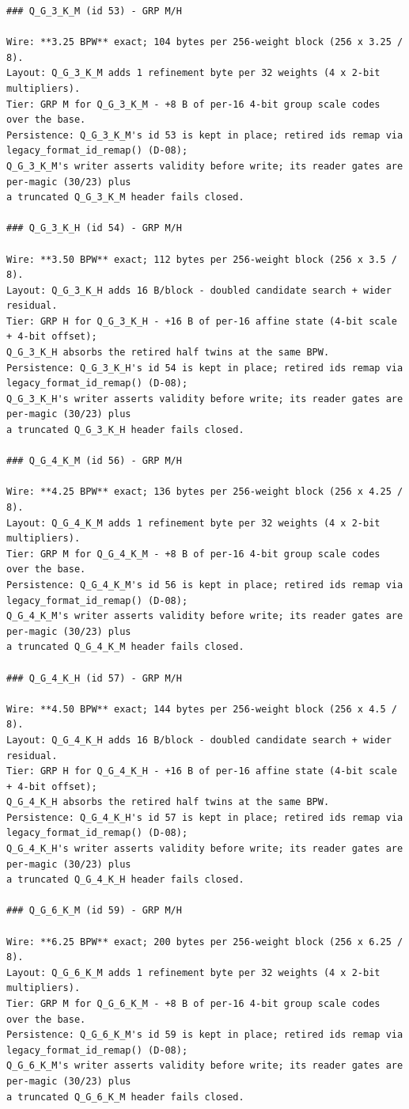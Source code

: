 \begin{Verbatim}[breaklines,breakanywhere,fontsize=\footnotesize]
### Q_G_3_K_M (id 53) - GRP M/H

Wire: **3.25 BPW** exact; 104 bytes per 256-weight block (256 x 3.25 / 8).
Layout: Q_G_3_K_M adds 1 refinement byte per 32 weights (4 x 2-bit multipliers).
Tier: GRP M for Q_G_3_K_M - +8 B of per-16 4-bit group scale codes over the base.
Persistence: Q_G_3_K_M's id 53 is kept in place; retired ids remap via legacy_format_id_remap() (D-08);
Q_G_3_K_M's writer asserts validity before write; its reader gates are per-magic (30/23) plus
a truncated Q_G_3_K_M header fails closed.

### Q_G_3_K_H (id 54) - GRP M/H

Wire: **3.50 BPW** exact; 112 bytes per 256-weight block (256 x 3.5 / 8).
Layout: Q_G_3_K_H adds 16 B/block - doubled candidate search + wider residual.
Tier: GRP H for Q_G_3_K_H - +16 B of per-16 affine state (4-bit scale + 4-bit offset);
Q_G_3_K_H absorbs the retired half twins at the same BPW.
Persistence: Q_G_3_K_H's id 54 is kept in place; retired ids remap via legacy_format_id_remap() (D-08);
Q_G_3_K_H's writer asserts validity before write; its reader gates are per-magic (30/23) plus
a truncated Q_G_3_K_H header fails closed.

### Q_G_4_K_M (id 56) - GRP M/H

Wire: **4.25 BPW** exact; 136 bytes per 256-weight block (256 x 4.25 / 8).
Layout: Q_G_4_K_M adds 1 refinement byte per 32 weights (4 x 2-bit multipliers).
Tier: GRP M for Q_G_4_K_M - +8 B of per-16 4-bit group scale codes over the base.
Persistence: Q_G_4_K_M's id 56 is kept in place; retired ids remap via legacy_format_id_remap() (D-08);
Q_G_4_K_M's writer asserts validity before write; its reader gates are per-magic (30/23) plus
a truncated Q_G_4_K_M header fails closed.

### Q_G_4_K_H (id 57) - GRP M/H

Wire: **4.50 BPW** exact; 144 bytes per 256-weight block (256 x 4.5 / 8).
Layout: Q_G_4_K_H adds 16 B/block - doubled candidate search + wider residual.
Tier: GRP H for Q_G_4_K_H - +16 B of per-16 affine state (4-bit scale + 4-bit offset);
Q_G_4_K_H absorbs the retired half twins at the same BPW.
Persistence: Q_G_4_K_H's id 57 is kept in place; retired ids remap via legacy_format_id_remap() (D-08);
Q_G_4_K_H's writer asserts validity before write; its reader gates are per-magic (30/23) plus
a truncated Q_G_4_K_H header fails closed.

### Q_G_6_K_M (id 59) - GRP M/H

Wire: **6.25 BPW** exact; 200 bytes per 256-weight block (256 x 6.25 / 8).
Layout: Q_G_6_K_M adds 1 refinement byte per 32 weights (4 x 2-bit multipliers).
Tier: GRP M for Q_G_6_K_M - +8 B of per-16 4-bit group scale codes over the base.
Persistence: Q_G_6_K_M's id 59 is kept in place; retired ids remap via legacy_format_id_remap() (D-08);
Q_G_6_K_M's writer asserts validity before write; its reader gates are per-magic (30/23) plus
a truncated Q_G_6_K_M header fails closed.


\end{Verbatim}
